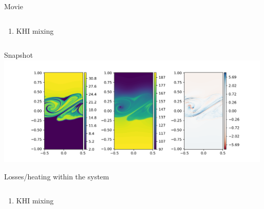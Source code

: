 \documentclass[10pt,aspectratio=169,usenames,dvipsnames]{beamer}
\begin{document}


\begin{frame}{Movie}
\begin{columns}
\begin{column}{0.5\textwidth}
\begin{enumerate}
\item KHI mixing
\end{enumerate}
\end{column}
\begin{column}{0.5\textwidth}

\end{column}
\end{columns}
\end{frame}

\begin{frame}{Snapshot}
\includegraphics[width=0.99\textwidth]{2023Mixing/Figures/KHInlev_testplot2.png}
\end{frame}

\begin{frame}{Losses/heating within the system}
\begin{columns}
\begin{column}{0.5\textwidth}
\begin{enumerate}
\item KHI mixing
\end{enumerate}
\end{column}
\begin{column}{0.5\textwidth}

\end{column}
\end{columns}
\end{frame}
\end{document}
